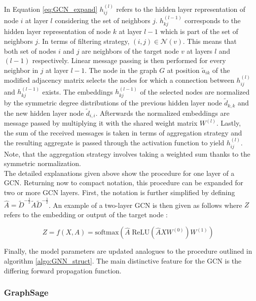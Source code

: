 	\noindent In Equation \ref{eq:GCN_expand} $h_{ij}^{(l)}$ refers to the 
	hidden layer representation of node $i$ at layer $l$ considering the set of
	neighbors $j$. $h_{kj}^{(l-1)}$ corresponds to the hidden layer
	representation of node $k$ at layer $l-1$ which is part of the set of 
	neighbors $j$. In terms of filtering strategy, $(i,j) \in \mathcal{N}(v)$. 
	This means that both set of nodes $i$ and $j$ are neighbors of the target 
	node $v$ at layers $l$ and $(l-1)$ respectively. Linear message
	passing is then performed for every neighbor in $j$ at layer $l-1$. The node 
	in the graph $G$ at position $\tilde a_{ik}$ of the modified adjacency matrix 
	selects the nodes for which a connection between $h_{ij}^{(l)}$ and
	$h_{kj}^{(l-1)}$ exists. The embeddings $h_{kj}^{(l-1)}$ of the selected 
	nodes are normalized by the symmetric degree distributions of the previous 
	hidden layer node $\tilde d_{k,k}$ and the new hidden layer node $\tilde d_{i,i}$.
	Afterwards the normalized embeddings are message passed by multiplying it
	with the shared weight matrix $W^{(l)}$. Lastly, the sum of the received
	messages is taken in terms of aggregation strategy and the resulting
	aggregate is passed through the activation function to yield $h_{ij}^{(l)}$.
	Note, that the aggregation strategy involves taking a weighted sum thanks
	to the symmetric normalization. \\

	\noindent The detailed explanations given above show the procedure for
	one layer of a GCN. Returning now to compact notation, this procedure can be
	expanded for two or more GCN layers. First, the notation is further
	simplified by defining $\hat A = \tilde D^{-\frac{1}{2}}\tilde A \tilde
	D^{-\frac{1}{2}}$. An example of a two-layer GCN is then given as follows 
	where $Z$ refers to the embedding or output of the target node 
	\citep[p. 3]{kipf2016semi}:

	\begin{equation}
		Z = f(X,A) = \text{softmax}\left(\hat A \;\text{ReLU}\left(\hat A X
		W^{(0)}\right)W^{(1)}\right)
	\label{eq:GCN_forward}
	\end{equation}

	\noindent Finally, the model parameters are updated analogues to the
	procedure outlined in algorithm \ref{algo:GNN_struct}. The main distinctive
	feature for the GCN is the differing forward propagation function. 

	\subsubsection{GraphSage}
	

